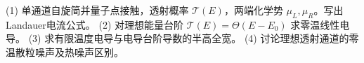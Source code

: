 (1) 单通道自旋简并量子点接触，透射概率 \(\mathcal T(E)\)，两端化学势 \(\mu_L,\mu_R\)。写出Landauer电流公式。
(2) 对理想能量台阶 \(\mathcal T(E)=\Theta(E-E_0)\) 求零温线性电导。
(3) 求有限温度电导与电导台阶导数的半高全宽。
(4) 讨论理想透射通道的零温散粒噪声及热噪声区别。
